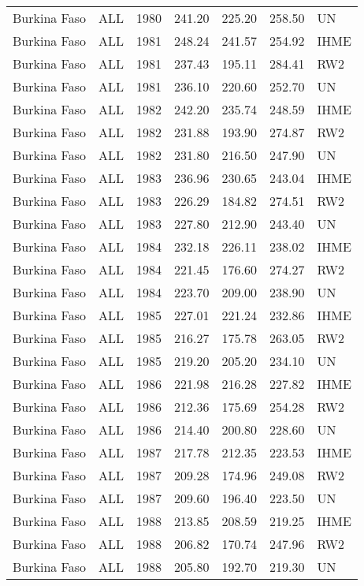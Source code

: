 \begin{longtable}{lllrrrl}
  Burkina Faso & ALL & 1980 & 241.20 & 225.20 & 258.50 & UN \\ 
  Burkina Faso & ALL & 1981 & 248.24 & 241.57 & 254.92 & IHME \\ 
  Burkina Faso & ALL & 1981 & 237.43 & 195.11 & 284.41 & RW2 \\ 
  Burkina Faso & ALL & 1981 & 236.10 & 220.60 & 252.70 & UN \\ 
  Burkina Faso & ALL & 1982 & 242.20 & 235.74 & 248.59 & IHME \\ 
  Burkina Faso & ALL & 1982 & 231.88 & 193.90 & 274.87 & RW2 \\ 
  Burkina Faso & ALL & 1982 & 231.80 & 216.50 & 247.90 & UN \\ 
  Burkina Faso & ALL & 1983 & 236.96 & 230.65 & 243.04 & IHME \\ 
  Burkina Faso & ALL & 1983 & 226.29 & 184.82 & 274.51 & RW2 \\ 
  Burkina Faso & ALL & 1983 & 227.80 & 212.90 & 243.40 & UN \\ 
  Burkina Faso & ALL & 1984 & 232.18 & 226.11 & 238.02 & IHME \\ 
  Burkina Faso & ALL & 1984 & 221.45 & 176.60 & 274.27 & RW2 \\ 
  Burkina Faso & ALL & 1984 & 223.70 & 209.00 & 238.90 & UN \\ 
  Burkina Faso & ALL & 1985 & 227.01 & 221.24 & 232.86 & IHME \\ 
  Burkina Faso & ALL & 1985 & 216.27 & 175.78 & 263.05 & RW2 \\ 
  Burkina Faso & ALL & 1985 & 219.20 & 205.20 & 234.10 & UN \\ 
  Burkina Faso & ALL & 1986 & 221.98 & 216.28 & 227.82 & IHME \\ 
  Burkina Faso & ALL & 1986 & 212.36 & 175.69 & 254.28 & RW2 \\ 
  Burkina Faso & ALL & 1986 & 214.40 & 200.80 & 228.60 & UN \\ 
  Burkina Faso & ALL & 1987 & 217.78 & 212.35 & 223.53 & IHME \\ 
  Burkina Faso & ALL & 1987 & 209.28 & 174.96 & 249.08 & RW2 \\ 
  Burkina Faso & ALL & 1987 & 209.60 & 196.40 & 223.50 & UN \\ 
  Burkina Faso & ALL & 1988 & 213.85 & 208.59 & 219.25 & IHME \\ 
  Burkina Faso & ALL & 1988 & 206.82 & 170.74 & 247.96 & RW2 \\ 
  Burkina Faso & ALL & 1988 & 205.80 & 192.70 & 219.30 & UN \\ 

\end{longtable}
